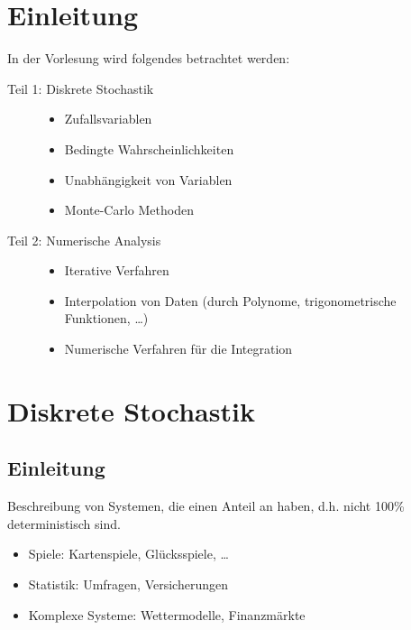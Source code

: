\section*{Einleitung}
In der Vorlesung wird folgendes betrachtet werden:
\begin{description}
    \item[Teil 1: Diskrete Stochastik]
        \begin{itemize}
            \item Zufallsvariablen
            \item Bedingte Wahrscheinlichkeiten
            \item Unabhängigkeit von Variablen
            \item Monte-Carlo Methoden
        \end{itemize}
    \item[Teil 2: Numerische Analysis]
        \begin{itemize}
            \item Iterative Verfahren
            \item Interpolation von Daten (durch Polynome, trigonometrische Funktionen, \ldots)
            \item Numerische Verfahren für die Integration
        \end{itemize}
\end{description}


\section{Diskrete Stochastik}
\subsection{Einleitung}
\begin{goal}
    Beschreibung von Systemen, die einen Anteil an  haben, d.h. nicht 100\% deterministisch sind.
\end{goal}
\begin{example}
    \begin{itemize}
        \item Spiele: Kartenspiele, Glücksspiele, \ldots
        \item Statistik: Umfragen, Versicherungen
        \item Komplexe Systeme: Wettermodelle, Finanzmärkte
    \end{itemize}
\end{example}

